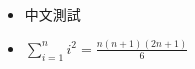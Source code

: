 \begin{itemize}
\item 中文測試 
\item $\sum \limits_{i=1}^n i^2 = \frac{n(n+1)(2n+1)}{6}$













































\end{itemize}